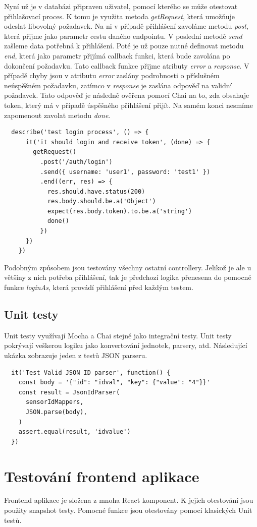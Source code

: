 \documentclass[thesis=M,czech]{FITthesis}[2018/10/20]
\begin{document}
Nyní už je v databázi připraven uživatel, pomocí kterého se může otestovat přihlašovací proces. K tomu je využita metoda \textit{getRequest}, která umožňuje odeslat libovolný požadavek. Na ni v případě přihlášení zavoláme metodu \textit{post}, která přijme jako parametr cestu daného endpointu. V poslední metodě \textit{send} zašleme data potřebná k přihlášení. Poté je už pouze nutné definovat metodu \textit{end}, která jako parametr přijímá callback funkci, která bude zavolána po dokončení požadavku. Tato callback funkce přijme atributy \textit{error} a \textit{response}. V případě chyby jsou v atributu \textit{error} zaslány podrobnosti o příslušném neúspěšném požadavku, zatímco v \textit{response} je zaslána odpověď na validní požadavek. Tato odpověď je následně ověřena pomocí Chai na to, zda obsahuje token, který má v případě úspěšného přihlášení přijít. Na samém konci nesmíme zapomenout zavolat metodu \textit{done}.
\newpage
\begin{lstlisting}
  describe('test login process', () => {
      it('it should login and receive token', (done) => {
        getRequest()
          .post('/auth/login')
          .send({ username: 'user1', password: 'test1' })
          .end((err, res) => {
            res.should.have.status(200)
            res.body.should.be.a('Object')
            expect(res.body.token).to.be.a('string')
            done()
          })  
      })  
    })
\end{lstlisting}
Podobným způsobem jsou testovány všechny ostatní controllery. Jelikož je ale u většiny z nich potřeba přihlášení, tak je předchozí logika přenesena do pomocné funkce \textit{loginAs}, která provádí přihlášení před každým testem.
\subsection{Unit testy}
Unit testy využívají Mocha a Chai stejně jako integrační testy. Unit testy pokrývají veškerou logiku jako konvertování jednotek, parsery, atd. Následující ukázka zobrazuje jeden z testů JSON parseru.
\begin{lstlisting}
  it('Test Valid JSON ID parser', function() {
    const body = '{"id": "idval", "key": {"value": "4"}}'
    const result = JsonIdParser(
      sensorIdMappers,
      JSON.parse(body),
    )
    assert.equal(result, 'idvalue')
  })
\end{lstlisting}
\newpage

\section{Testování frontend aplikace}
Frontend aplikace je složena z mnoha React komponent. K jejich otestování jsou použity snapshot testy. Pomocné funkce jsou otestovány pomocí klasických Unit testů.
\end{document}
